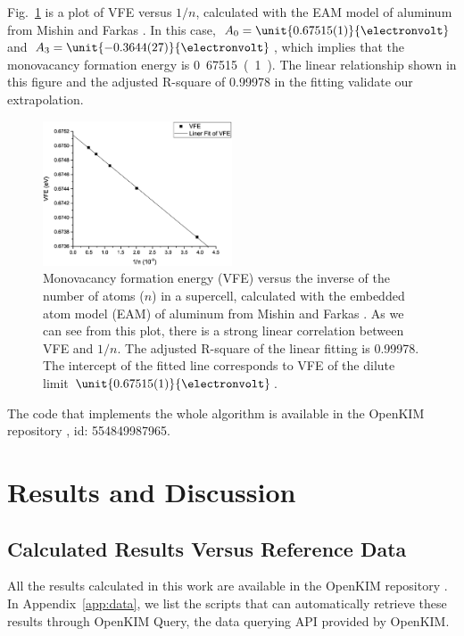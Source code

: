 \documentclass[%
 reprint,
 amsmath,amssymb,
 aps,
]{revtex4-1}
\begin{document}
Fig.~\ref{fig:VFEFitting} is a plot of VFE versus $1/n$, calculated with the EAM model of aluminum from Mishin and Farkas \cite{mishin1999interatomic}.
In this case, $A_0 = \unit{0.67515(1)}{\electronvolt}$ and $A_3 = \unit{-0.3644(27)}{\electronvolt}$, which implies that the monovacancy formation energy is \unit{0.67515(1)}{\electronvolt}.
The linear relationship shown in this figure and the adjusted R-square of 0.99978 in the fitting validate our extrapolation.
\begin{figure}
\includegraphics[width=0.5\textwidth]{AlMishinVFEFitting}%
\caption{\label{fig:VFEFitting}
  Monovacancy formation energy (VFE) versus the inverse of the number of atoms ($n$) in a supercell, calculated with the embedded atom model (EAM) of aluminum from Mishin and Farkas \cite{mishin1999interatomic}.
  As we can see from this plot, there is a strong linear correlation between VFE and $1/n$.
  The adjusted R-square of the linear fitting is 0.99978.
  The intercept of the fitted line corresponds to VFE of the dilute limit $\unit{0.67515(1)}{\electronvolt}$.
}
\end{figure}

The code that implements the whole algorithm is available in the OpenKIM repository \cite{openkim2016}, id: 554849987965.

\section{\label{sec:results}Results and Discussion}

\subsection{\label{sec:calcvsref}Calculated Results Versus Reference Data}

All the results calculated in this work are available in the OpenKIM repository \cite{openkim2016}.
In Appendix~\ref{app:data}, we list the scripts that can automatically retrieve these results through OpenKIM Query, the data querying API provided by OpenKIM.
\end{document}

